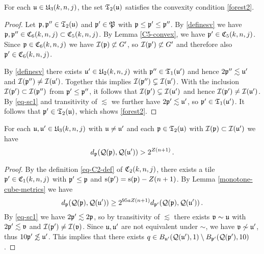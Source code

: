 {\begin{lemma}
    \label{forest-convex}
    For each $\fu\in \fU_3(k,n,j)$,
    the set $\mathfrak{T}_2(\fu)$
    satisfies the convexity condition \eqref{forest2}.
\end{lemma}

\begin{proof}
    Let $\fp, \fp'' \in \mathfrak{T}_2(\fu)$ and $\fp' \in \fP$ with $\fp \le \fp' \le \fp''$. By \eqref{definesv} we have $\fp, \fp'' \in \fC_6(k,n,j) \subset \fC_5(k,n,j)$. By Lemma \ref{C5-convex}, we have $\fp' \in \fC_5(k,n,j)$. Since $\fp \in \fC_6(k,n,j)$ we have $\sc(\fp) \not \subset G'$, so $\sc(\fp') \not \subset G'$ and therefore also $\fp' \in \fC_6(k,n,j)$.

    By \eqref{definesv} there exists $\fu' \in \fU_2(k,n,j)$ with $\fp'' \in \mathfrak{T}_1(\fu')$ and hence $2\fp'' \lesssim \fu'$ and $\sc(\fp'') \ne \sc(\fu')$. Together this implies $\sc(\fp'') \subsetneq \sc(\fu')$. With the inclusion $\sc(\fp') \subset \sc(\fp'')$ from $\fp' \le \fp''$, it follows that $\sc(\fp') \subsetneq \sc(\fu')$ and hence $\sc(\fp') \ne \sc(\fu')$.
    By \eqref{eq-sc1} and transitivity of $\lesssim$ we further have $2\fp' \lesssim \fu'$, so $\fp' \in \mathfrak{T}_1(\fu')$.
    It follows that $\fp' \in \mathfrak{T}_2(\fu)$, which shows \eqref{forest2}.
\end{proof}

\begin{lemma}
    \label{forest-separation}
    For each $\fu,\fu'\in \fU_3(k,n,j)$ with $\fu\neq \fu'$ and each $\fp \in \fT_2(\fu)$
    with $\sc(\fp)\subset \sc(\fu')$ we have
    \begin{equation}
    d_{\fp}(\fcc(\fp), \fcc(\fu')) > 2^{Z(n+1)}\,.
    \end{equation}
\end{lemma}

\begin{proof}
    By the definition \eqref{eq-C2-def} of $\fC_2(k,n,j)$, there exists a tile $\fp' \in \fC_1(k,n,j)$ with $\fp' \le \fp$ and $\ps(\fp') = \ps(\fp)- Z(n+1)$.
    By Lemma \ref{monotone-cube-metrics} we have
    $$
        d_{\fp}(\fcc(\fp), \fcc(\fu')) \ge 2^{95a Z(n+1)} d_{\fp'}(\fcc(\fp), \fcc(\fu'))\,.
    $$
    By \eqref{eq-sc1} we have $2\fp' \lesssim 2\fp$, so by transitivity of $\lesssim$ there exists $\mathfrak{v} \sim \fu$ with $2\fp' \lesssim \mathfrak{v}$ and $\sc(\fp') \ne \sc(\mathfrak{v})$. Since $\fu, \fu'$ are not equivalent under $\sim$, we have $\mathfrak{v} \not \sim \fu'$, thus $10\fp' \not\lesssim \fu'$. This implies that there exists $q \in B_{\fu'}(\fcc(\fu'), 1) \setminus B_{\fp'}(\fcc(\fp'), 10)$.


\end{proof}}
